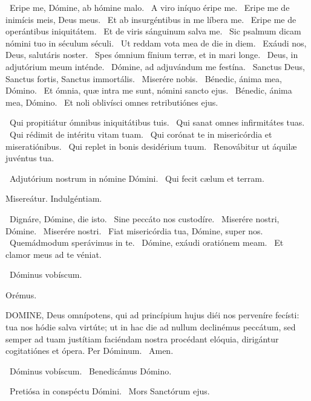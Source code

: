 
\V\ Eripe me, Dómine, ab hómine malo. \R\ A viro iníquo éripe me. \V\ Eripe me de inimícis meis, Deus meus. \R\ Et ab insurgéntibus in me líbera me. \V\ Eripe me de operántibus iniquitátem. \R\ Et de viris sánguinum salva me. \V\ Sic psalmum dicam nómini tuo in séculum séculi. \R\ Ut reddam vota mea de die in diem. \V\ Exáudi nos, Deus, salutáris noster. \R\ Spes ómnium fínium terræ, et in mari longe. \V\ Deus, in adjutórium meum inténde. \R\ Dómine, ad adjuvándum me festína. \V\ Sanctus Deus, Sanctus fortis, Sanctus immortális. \R\ Miserére nobis. \V\ Bénedic, ánima mea, Dómino. \R\ Et ómnia, quæ intra me sunt, nómini sancto ejus. \V\ Bénedic, ánima mea, Dómino. \R\ Et noli oblivísci omnes retributiónes ejus.

\V\ Qui propitiátur ómnibus iniquitátibus tuis. \R\ Qui sanat omnes infirmitátes tuas. \V\ Qui rédimit de intéritu vitam tuam. \R\ Qui corónat te in misericórdia et miseratiónibus. \V\ Qui replet in bonis desidérium tuum. \R\ Renovábitur ut áquilæ juvéntus tua.


\V\ Adjutórium nostrum in nómine Dómini. \R\ Qui fecit cælum et terram.

 Misereátur. Indulgéntiam.

\V\ Dignáre, Dómine, die isto. \R\ Sine peccáto nos custodíre. \V\ Miserére nostri, Dómine. \R\ Miserére nostri. \V\ Fiat misericórdia tua, Dómine, super nos. \R\ Quemádmodum sperávimus in te. \V\ Dómine, exáudi oratiónem meam. \R\ Et clamor meus ad te véniat.

\sectionornament

\V\ Dóminus vobíscum.

Orémus. 

\lettrine[lines=2]{D}{OMINE}, Deus omnípotens, qui ad princípium hujus diéi nos perveníre fecísti: tua nos hódie salva virtúte; ut in hac die ad nullum declinémus peccátum, sed semper ad tuam justítiam faciéndam nostra procédant elóquia, dirigántur cogitatiónes et ópera. Per Dóminum. \R\ Amen.

\V\ Dóminus vobíscum. \V\ Benedicámus Dómino.


\V\ Pretiósa in conspéctu Dómini. \R\ Mors Sanctórum ejus.


